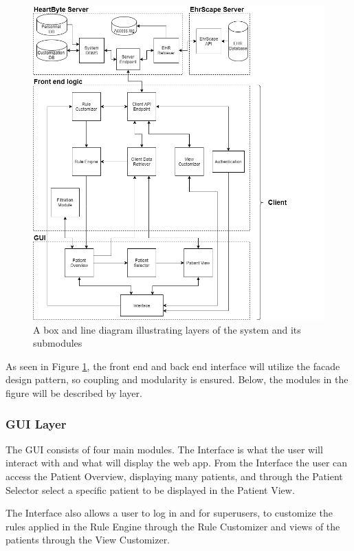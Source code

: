 \documentclass{article}
\begin{document}
\begin{figure}[h]
    \centering
    \includegraphics[scale = 0.45]{box-and-line}
    \caption{A box and line diagram illustrating layers of the system and its submodules}
    \label{fig:execution-view}
\end{figure}

As seen in Figure \ref{fig:execution-view}, the front end and back end interface will utilize the facade design pattern, so coupling and modularity is ensured. Below, the modules in the figure will be described by layer.

\subsubsection{GUI Layer}
The GUI consists of four main modules. The Interface is what the user will interact with and what will display the web app. From the Interface the user can access the Patient Overview, displaying many patients, and through the Patient Selector select a specific patient to be displayed in the Patient View. 

The Interface also allows a user to log in and for superusers, to customize the rules applied in the Rule Engine through the Rule Customizer and views of the patients through the View Customizer.
\end{document}
